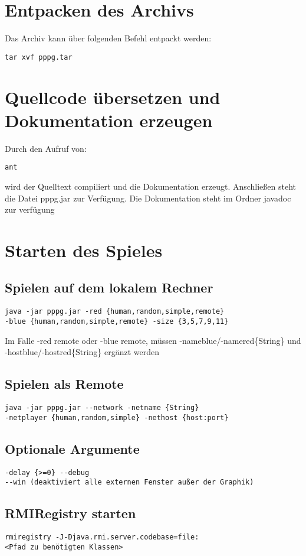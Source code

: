 \documentclass{scrartcl}
\begin{document}
\section*{Entpacken des Archivs}
Das Archiv kann über folgenden Befehl entpackt werden:
\begin{lstlisting}
tar xvf pppg.tar
\end{lstlisting}
\section*{Quellcode übersetzen und Dokumentation erzeugen}
Durch den Aufruf von:
\begin{lstlisting}
ant
\end{lstlisting}
wird der Quelltext compiliert und die Dokumentation erzeugt. Anschließen steht die Datei pppg.jar zur Verfügung. Die Dokumentation steht im Ordner javadoc zur verfügung
\section*{Starten des Spieles}
\subsection*{Spielen auf dem lokalem Rechner}
\begin{lstlisting}
java -jar pppg.jar -red {human,random,simple,remote} 
-blue {human,random,simple,remote} -size {3,5,7,9,11}
\end{lstlisting}
Im Falle -red remote oder -blue remote, müssen -nameblue/-namered\{String\} und\newline
 -hostblue/-hostred\{String\} ergänzt werden
\subsection*{Spielen als Remote}
\begin{lstlisting}
java -jar pppg.jar --network -netname {String} 
-netplayer {human,random,simple} -nethost {host:port}
\end{lstlisting}
\subsection*{Optionale Argumente}
\begin{lstlisting}
-delay {>=0} --debug 
--win (deaktiviert alle externen Fenster außer der Graphik)
\end{lstlisting}
\subsection*{RMIRegistry starten}
\begin{lstlisting}
rmiregistry -J-Djava.rmi.server.codebase=file:
<Pfad zu benötigten Klassen>
\end{lstlisting}
\end{document}
